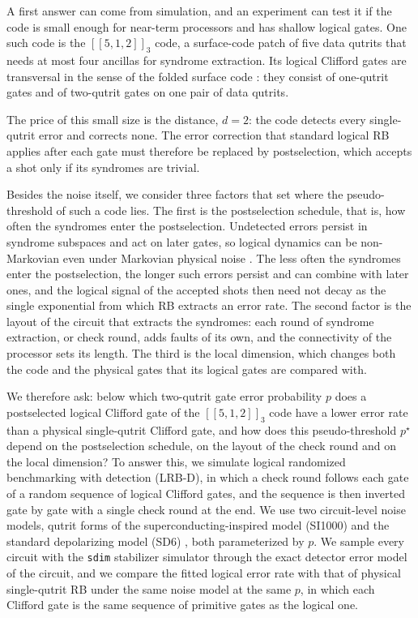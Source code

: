 A first answer can come from simulation, and an experiment can test it if the code is small enough for near-term processors and has shallow logical gates. One such code is the $[[5,1,2]]_3$ code, a surface-code patch of five data qutrits that needs at most four ancillas for syndrome extraction. Its logical Clifford gates are transversal in the sense of the folded surface code \cite{Moussa2016}: they consist of one-qutrit gates and of two-qutrit gates on one pair of data qutrits.

The price of this small size is the distance, $d = 2$: the code detects every single-qutrit error and corrects none. The error correction that standard logical RB applies after each gate \cite{Combes2017} must therefore be replaced by postselection, which accepts a shot only if its syndromes are trivial.

Besides the noise itself, we consider three factors that set where the pseudo-threshold of such a code lies. The first is the postselection schedule, that is, how often the syndromes enter the postselection. Undetected errors persist in syndrome subspaces and act on later gates, so logical dynamics can be non-Markovian even under Markovian physical noise \cite{Ziyad2025}. The less often the syndromes enter the postselection, the longer such errors persist and can combine with later ones, and the logical signal of the accepted shots then need not decay as the single exponential from which RB extracts an error rate. The second factor is the layout of the circuit that extracts the syndromes: each round of syndrome extraction, or check round, adds faults of its own, and the connectivity of the processor sets its length. The third is the local dimension, which changes both the code and the physical gates that its logical gates are compared with.

We therefore ask: below which two-qutrit gate error probability $p$ does a postselected logical Clifford gate of the $[[5,1,2]]_3$ code have a lower error rate than a physical single-qutrit Clifford gate, and how does this pseudo-threshold $p^\star$ depend on the postselection schedule, on the layout of the check round and on the local dimension? To answer this, we simulate logical randomized benchmarking with detection (LRB-D), in which a check round follows each gate of a random sequence of logical Clifford gates, and the sequence is then inverted gate by gate with a single check round at the end. We use two circuit-level noise models, qutrit forms of the superconducting-inspired model (SI1000) and the standard depolarizing model (SD6) \cite{GidneyHoneycomb2021}, both parameterized by $p$. We sample every circuit with the \texttt{sdim} stabilizer simulator \cite{sdim} through the exact detector error model of the circuit, and we compare the fitted logical error rate with that of physical single-qutrit RB under the same noise model at the same $p$, in which each Clifford gate is the same sequence of primitive gates as the logical one.

